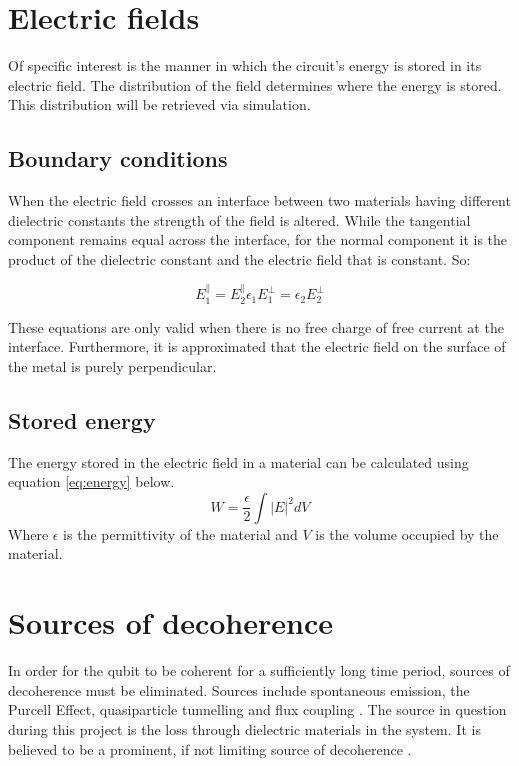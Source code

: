 \section{Electric fields}
Of specific interest is the manner in which the circuit's energy is stored in its electric field. The distribution of the field determines where the energy is stored. This distribution will be retrieved via simulation. 

\subsection{Boundary conditions}
When the electric field crosses an interface between two materials having different dielectric constants the strength of the field is altered. While the tangential component remains equal across the interface, for the normal component it is the product of the dielectric constant and the electric field that is constant. So:

\begin{subequations}\label{eq:ContinuityEq}
	\begin{equation} \label{eq:ContinuityEqA}
	E_{1}^{\parallel} = E_{2}^{\parallel}
	\end{equation}	
	\begin{equation} \label{eq:ContinuityEqB}
	\epsilon_{1}E_{1}^{\bot} = \epsilon_{2}E_{2}^{\bot}
	\end{equation}
\end{subequations}

These equations are only valid when there is no free charge of free current at the interface.
Furthermore, it is approximated that the electric field on the surface of the metal is purely perpendicular.
\subsection{Stored energy}
The energy stored in the electric field in a material can be calculated using equation \eqref{eq:energy} below.
\begin{equation} \label{eq:energy}
W = \frac{\epsilon}{2}\int{|E|}^{2}dV
\end{equation}
Where \(\epsilon\) is the permittivity of the material and \(V\) is the volume occupied by the material. 

\section{Sources of decoherence}
In order for the qubit to be coherent for a sufficiently long time period, sources of decoherence must be eliminated. Sources include spontaneous emission, the Purcell Effect, quasiparticle tunnelling and flux coupling \cite{Koch2007}.   
The source in question during this project is the loss through dielectric materials in the system. It is believed to be a prominent, if not limiting source of decoherence \cite{Koch2007}\cite{PhysRevLett.95.210503}. 
 
